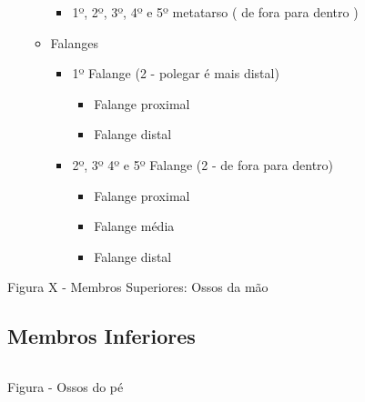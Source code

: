 \documentclass[
]{book}
\providecommand{\tightlist}{%
  \setlength{\itemsep}{0pt}\setlength{\parskip}{0pt}}
\begin{document}
\begin{itemize}
\begin{itemize}
    \begin{itemize}
    \tightlist
    \item
      1º, 2º, 3º, 4º e 5º metatarso ( de fora para dentro )
    \end{itemize}
  \item
    Falanges

    \begin{itemize}
    \tightlist
    \item
      1º Falange (2 - polegar é mais distal)

      \begin{itemize}
      \tightlist
      \item
        Falange proximal
      \item
        Falange distal
      \end{itemize}
    \item
      2º, 3º 4º e 5º Falange (2 - de fora para dentro)

      \begin{itemize}
      \tightlist
      \item
        Falange proximal
      \item
        Falange média
      \item
        Falange distal
      \end{itemize}
    \end{itemize}
  \end{itemize}
\end{itemize}

Figura X - Membros Superiores: Ossos da mão

\hypertarget{membros-inferiores}{%
\subsection{Membros Inferiores}\label{membros-inferiores}}

\begin{longtable}[]{@{}
  >{\raggedright\arraybackslash}p{}
  >{\raggedright\arraybackslash}p{}@{}}
\toprule()
\endhead
& \\
\bottomrule()
\end{longtable}

Figura - Ossos do pé
\end{document}
